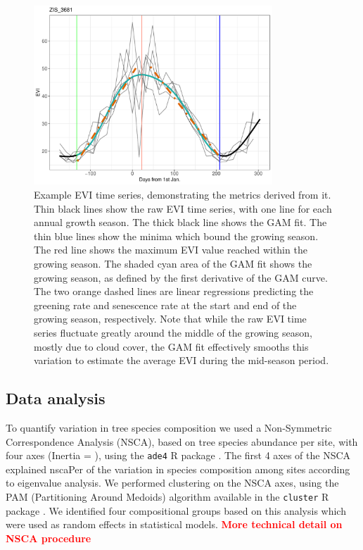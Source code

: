 \documentclass[11pt,a4paper]{article}
\newcommand{\todo}[1]{\textcolor{red}{\textbf{#1}}}   %
\begin{document}
\begin{figure}[H]
\centering
	\includegraphics[width=0.8\textwidth]{ts_example}
	\caption{Example EVI time series, demonstrating the metrics derived from it. Thin black lines show the raw EVI time series, with one line for each annual growth season. The thick black line shows the GAM fit. The thin blue lines show the minima which bound the growing season. The red line shows the maximum EVI value reached within the growing season. The shaded cyan area of the GAM fit shows the growing season, as defined by the first derivative of the GAM curve. The two orange dashed lines are linear regressions predicting the greening rate and senescence rate at the start and end of the growing season, respectively. Note that while the raw EVI time series fluctuate greatly around the middle of the growing season, mostly due to cloud cover, the GAM fit effectively smooths this variation to estimate the average EVI during the mid-season period.}
	\label{ts_example}
\end{figure}

\subsection{Data analysis}

To quantify variation in tree species composition we used a Non-Symmetric Correspondence Analysis (NSCA), based on tree species abundance per site, with four axes (Inertia = \nscaInertia{}), using the \texttt{ade4} R package \citep{ade4}. The first 4 axes of the NSCA explained nscaPer{} of the variation in species composition among sites according to eigenvalue analysis. We performed clustering on the NSCA axes, using the PAM (Partitioning Around Medoids) algorithm available in the \texttt{cluster} R package \citep{cluster}. We identified four compositional groups based on this analysis which were used as random effects in statistical models. \todo{More technical detail on NSCA procedure}
\end{document}
